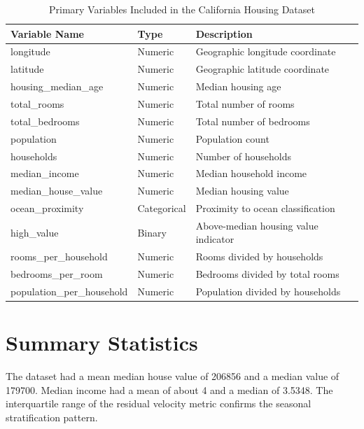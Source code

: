 \documentclass[12pt]{report}
\begin{document}
\begin{table}[H]
\centering
\caption{Primary Variables Included in the California Housing Dataset}
\begin{tabular}{lll}
\toprule
Variable Name & Type & Description \\
\midrule
longitude & Numeric & Geographic longitude coordinate \\
latitude & Numeric & Geographic latitude coordinate \\
housing\_median\_age & Numeric & Median housing age \\
total\_rooms & Numeric & Total number of rooms \\
total\_bedrooms & Numeric & Total number of bedrooms \\
population & Numeric & Population count \\
households & Numeric & Number of households \\
median\_income & Numeric & Median household income \\
median\_house\_value & Numeric & Median housing value \\
ocean\_proximity & Categorical & Proximity to ocean classification \\
high\_value & Binary & Above-median housing value indicator \\
rooms\_per\_household & Numeric & Rooms divided by households \\
bedrooms\_per\_room & Numeric & Bedrooms divided by total rooms \\
population\_per\_household & Numeric & Population divided by households \\
\bottomrule
\end{tabular}
\end{table}

\section{Summary Statistics}

The dataset had a mean median house value of 206856 and a median value of 179700. Median income had a mean of about 4 and a median of 3.5348. The interquartile range of the residual velocity metric confirms the seasonal stratification pattern.
\end{document}

